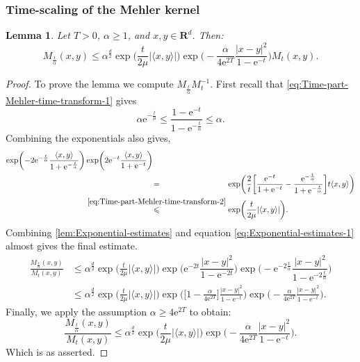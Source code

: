 \documentclass[a4paper,oneside,10pt]{amsproc}
\newtheorem{lemma}{Lemma}
\theoremstyle{remark}
\newcommand{\la}{\langle}
\newcommand{\ra}{\rangle}
\renewcommand{\leq}{\leqslant}
\renewcommand{\leq}{\leqslant}
\renewcommand{\geq}{\geqslant}
\newcommand{\R}{\mathbf R}
\newcommand{\e}{\mathrm{e}} %
\renewcommand{\leq}{\leqslant}%
\renewcommand{\geq}{\geqslant}%
\begin{document}
\subsubsection{Time-scaling of the Mehler kernel}
\begin{lemma}\label{lem:Kernel-estimates-1}
  Let $T > 0$, $\alpha \geq 1$, and $x, y \in \R^d$. Then:
  \begin{equation}
    \label{eq:Kernel-lemma-1-estimate} 
    M_{\frac{t}{\alpha}}(x, y) \leq \alpha^{\frac{d}2}
    \exp\biggl (\frac{t}{2\mu} |\la x, y \ra| \biggr)
   \exp\biggl(-\frac{\alpha}{4\e^{2T}} \frac{|x - y|^2}{1 - \e^{-t}}
   \biggr) M_{t}(x, y).
  \end{equation}
\end{lemma}
\begin{proof}
  To prove the lemma we compute $M_{\frac{t}{\alpha}} M_t^{-1}$.
  First recall that \eqref{eq:Time-part-Mehler-time-transform-1} gives
  \begin{equation*}
    \alpha \e^{-\frac{t}\mu} \leq \frac{1 - \e^{-t}}{1 -
      \e^{-\frac{t}{\alpha}}} \leq \alpha.
  \end{equation*}
  Combining the exponentials also gives,
  \begin{align*}
    \exp \biggl (-2\e^{-\frac{t}\alpha} \frac{\la x, y \ra}{1 + \e^{-\frac{t}{\alpha}}}
    \biggr ) &\exp \biggl (2 \e^{-t} \frac{\la x, y \ra}{1 + \e^{-t}}
    \biggr )\\
    &\stackrel{\phantom{\eqref{eq:Time-part-Mehler-time-transform-2}}}{=}
    \exp\biggl (\frac2{t}\biggl[\frac{\e^{-t}}{1 + \e^{-t}} - \frac{\e^{-\frac{t}\alpha}}{1 +
      \e^{-\frac{t}{\alpha}}} \biggr] t \la x, y \ra \biggr)\\
    &\stackrel{\eqref{eq:Time-part-Mehler-time-transform-2}}{\leq}
    \exp\biggl (\frac{t}{2\mu} |\la x, y \ra| \biggr).
  \end{align*}
  Combining \autoref{lem:Exponential-estimates} and equation
  \eqref{eq:Exponential-estimates-1} almost gives the final estimate.
  \begin{align*}
    \frac{M_{\frac{t}{\alpha}}(x, y)}{M_{t}(x, y)} &\leq
    \alpha^{\frac{d}2} \exp\biggl (\frac{t}{2\mu} |\la x, y \ra| \biggr)
    \exp\biggl(\e^{-2t} \dfrac{|x - y|^2}{1 - \e^{-2t}} \biggr)
    \exp\biggl(-\e^{-2\frac{t}{\alpha}} \dfrac{|x - y|^2}{1 -
      \e^{-2\frac{t}{\alpha}}}  \biggr)\\ 
    &\leq \alpha^{\frac{d}2} \exp\biggl (\frac{t}{2\mu} |\la x, y \ra|
    \biggr) \exp \biggl (\biggl[1 -\frac{\alpha}{4\e^{2 T}} \biggr] 
    \frac{|x - y|^2}{1 - \e^{-t}} \biggr ) \exp \biggl
    (-\frac{\alpha}{4\e^{2 T}} \frac{|x - y|^2}{1 - \e^{-t}} \biggr
    ).
  \end{align*}
  Finally, we apply the assumption $\alpha \geq 4 \e^{2 T}$ to obtain:
  \begin{equation*}
    \frac{M_{\frac{t}{\alpha}}(x, y)}{M_t(x, y)} \leq \alpha^{\frac{d}2}
   \exp\biggl (\frac{t}{2\mu} |\la x, y \ra| \biggr)
   \exp\biggl(-\frac{\alpha}{4\e^{2T}} \frac{|x - y|^2}{1 - \e^{-t}}
   \biggr). 
 \end{equation*}
  Which is as asserted.
\end{proof}
\end{document}
